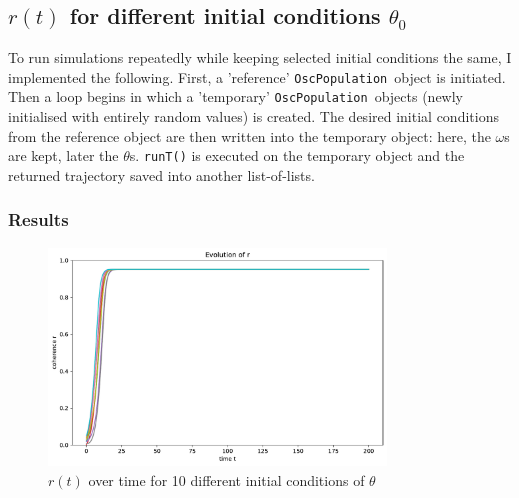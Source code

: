 \documentclass[11pt,a4paper]{article}
\newcommand{\oscpop}{\texttt{OscPopulation}~}
\newcommand{\code}[1]{\texttt{#1}}
\begin{document}
\clearpage
\subsection{$r(t)$ for different initial conditions $\theta_0$}

To run simulations repeatedly while keeping selected initial conditions the same, I implemented the following. 
First, a 'reference' \oscpop object is initiated. 
Then a loop begins in which a 'temporary' \oscpop objects (newly initialised with entirely random values) is created. 
The desired initial conditions from the reference object are then written into the temporary object: here, the $\omega$s are kept, later the $\theta$s. 
\code{runT()} is executed on the temporary object and the returned trajectory saved into another list-of-lists. 








\subsubsection{Results}

\begin{figure}[h]
	\centering
	\includegraphics[width=0.8\textwidth]{graphics/4_t-vs-r_fixedOmegas_omegaDistr=uniform_N=2000_1611570486.pdf}
	\caption{$r(t)$ over time for 10 different initial conditions of $\theta$}
	\label{4}
\end{figure}











\clearpage
\end{document}
